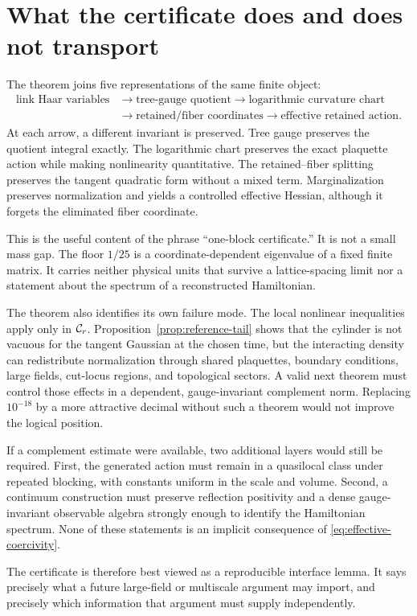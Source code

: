 \section{What the certificate does and does not transport}\label{sec:discussion}

The theorem joins five representations of the same finite object:
\[
\begin{aligned}
 \text{link Haar variables}
 &\longrightarrow \text{tree-gauge quotient}
 \longrightarrow \text{logarithmic curvature chart}\\
 &\longrightarrow \text{retained/fiber coordinates}
 \longrightarrow \text{effective retained action}.
\end{aligned}
\]
At each arrow, a different invariant is preserved.  Tree gauge preserves the
quotient integral exactly.  The logarithmic chart preserves the exact
plaquette action while making nonlinearity quantitative.  The
retained--fiber splitting preserves the tangent quadratic form without a
mixed term.  Marginalization preserves normalization and yields a controlled
effective Hessian, although it forgets the eliminated fiber coordinate.

This is the useful content of the phrase ``one-block certificate.''  It is
not a small mass gap.  The floor $1/25$ is a coordinate-dependent eigenvalue
of a fixed finite matrix.  It carries neither physical units that survive a
lattice-spacing limit nor a statement about the spectrum of a reconstructed
Hamiltonian.

The theorem also identifies its own failure mode.  The local nonlinear
inequalities apply only in $\mathcal C_r$.  Proposition~\ref{prop:reference-tail}
shows that the cylinder is not vacuous for the tangent Gaussian at the chosen
time, but the interacting density can redistribute normalization through
shared plaquettes, boundary conditions, large fields, cut-locus regions, and
topological sectors.  A valid next theorem must control those effects in a
dependent, gauge-invariant complement norm.  Replacing $10^{-18}$ by a more
attractive decimal without such a theorem would not improve the logical
position.

If a complement estimate were available, two additional layers would still
be required.  First, the generated action must remain in a quasilocal class
under repeated blocking, with constants uniform in the scale and volume.
Second, a continuum construction must preserve reflection positivity and a
dense gauge-invariant observable algebra strongly enough to identify the
Hamiltonian spectrum.  None of these statements is an implicit consequence
of \eqref{eq:effective-coercivity}.

The certificate is therefore best viewed as a reproducible interface lemma.
It says precisely what a future large-field or multiscale argument may import,
and precisely which information that argument must supply independently.
